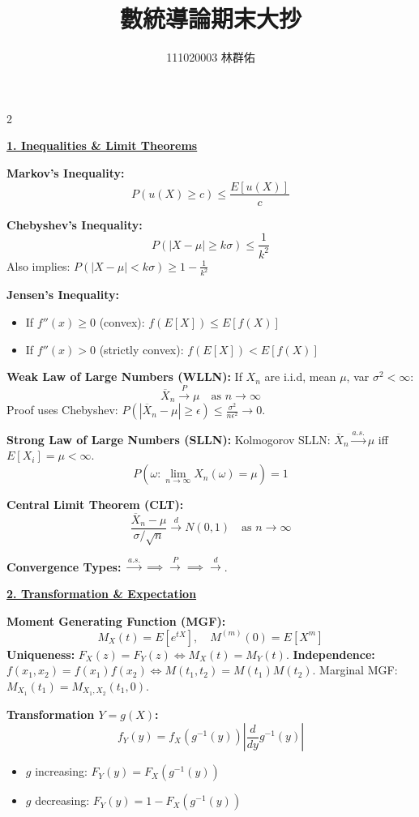 \documentclass{article}
\title{數統導論期末大抄}
\author{111020003 林群佑}
\date{}
\newcommand{\sectiontitle}[1]{\vspace{0.2cm}\textbf{\large \underline{#1}}\vspace{0.1cm}}
\newcommand{\distname}[1]{\textbf{#1}}
\begin{document}
\vspace{-1.5cm} %

\begin{multicols*}{2} %

\sectiontitle{1. Inequalities \& Limit Theorems}

\distname{Markov's Inequality:}
\[ P(u(X) \ge c) \le \frac{E[u(X)]}{c} \]

\distname{Chebyshev's Inequality:}
\[ P(|X-\mu| \ge k\sigma) \le \frac{1}{k^2} \]
Also implies: $P(|X-\mu| < k\sigma) \ge 1 - \frac{1}{k^2}$

\distname{Jensen's Inequality:}
\begin{itemize}[leftmargin=*]
    \item If $f''(x) \ge 0$ (convex): $f(E[X]) \le E[f(X)]$
    \item If $f''(x) > 0$ (strictly convex): $f(E[X]) < E[f(X)]$
\end{itemize}

\distname{Weak Law of Large Numbers (WLLN):}
If $X_n$ are i.i.d, mean $\mu$, var $\sigma^2 < \infty$:
\[ \overline{X}_n \xrightarrow{P} \mu \quad \text{as } n \to \infty \]
Proof uses Chebyshev: $P(|\overline{X}_n - \mu| \ge \epsilon) \le \frac{\sigma^2}{n\epsilon^2} \to 0$.

\distname{Strong Law of Large Numbers (SLLN):}
Kolmogorov SLLN: $\overline{X}_n \xrightarrow{a.s.} \mu$ iff $E[X_i] = \mu < \infty$.
\[ P(\omega : \lim_{n \to \infty} X_n(\omega) = \mu) = 1 \]

\distname{Central Limit Theorem (CLT):}
\[ \frac{\overline{X}_n - \mu}{\sigma/\sqrt{n}} \xrightarrow{d} N(0,1) \quad \text{as } n \to \infty \]

\distname{Convergence Types:}
$\xrightarrow{a.s.} \implies \xrightarrow{P} \implies \xrightarrow{d}$.

\sectiontitle{2. Transformation \& Expectation}

\distname{Moment Generating Function (MGF):}
\[ M_X(t) = E[e^{tX}], \quad M^{(m)}(0) = E[X^m] \]
\textbf{Uniqueness:} $F_X(z) = F_Y(z) \iff M_X(t) = M_Y(t)$.
\textbf{Independence:} $f(x_1, x_2) = f(x_1)f(x_2) \iff M(t_1, t_2) = M(t_1)M(t_2)$.
Marginal MGF: $M_{X_1}(t_1) = M_{X_1, X_2}(t_1, 0)$.

\distname{Transformation $Y=g(X)$:}
\[ f_Y(y) = f_X(g^{-1}(y)) \left| \frac{d}{dy}g^{-1}(y) \right| \]
\begin{itemize}[leftmargin=*]
    \item $g$ increasing: $F_Y(y) = F_X(g^{-1}(y))$
    \item $g$ decreasing: $F_Y(y) = 1 - F_X(g^{-1}(y))$
\end{itemize}


\end{multicols*}
\end{document}
